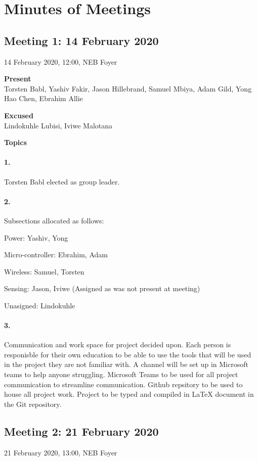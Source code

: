 \documentclass[12pt]{article}
\begin{document}
\newpage
\section{Minutes of Meetings}
\subsection{Meeting 1: 14 February 2020}
14 February 2020, 12:00, NEB Foyer

\textbf{Present}\\
Torsten Babl, Yashiv Fakir, Jason Hillebrand, Samuel Mbiya, Adam Gild, Yong Hao Chen, Ebrahim Allie

\textbf{Excused}\\
Lindokuhle Lubisi, Iviwe Malotana

\textbf{Topics}
\paragraph[short]{1.} Torsten Babl elected as group leader.
\paragraph[short]{2.} Subsections allocated as follows:

Power: Yashiv, Yong

Micro-controller:	Ebrahim, Adam

Wireless:	Samuel,	Torsten

Sensing: Jason, Iviwe (Assigned as was not present at meeting)
  
Unasigned: Lindokuhle

\paragraph[short]{3.} Communication and work space for project decided upon. Each person is responisble for their own education to be able to use the tools that will be used in the project they are not familiar with. A channel will be set up in Microsoft teams to help anyone struggling.  
Microsoft Teams to be used for all project communication to streamline communication.
Github repsitory to be used to house all project work.
Project to be typed and compiled in LaTeX document in the Git repository.
\newpage

\subsection{Meeting 2: 21 February 2020}
21 February 2020, 13:00, NEB Foyer
\end{document}
